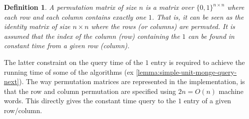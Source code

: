 \documentclass[twoside,11pt,openright]{report}
\newtheorem{mydef}{Definition}
\begin{document}
\begin{mydef}
  A permutation matrix of size $n$ is a matrix over $\{0,1\}^{n \times n}$ where each row and each column contains exactly one $1$. That is, it can be seen as the identity matrix of size $n \times n$ where the rows (or columns) are permuted.
  It is assumed that the index of the column (row) containing the $1$ can be found in constant time from a given row (column).
\end{mydef}
The latter constraint on the query time of the $1$ entry is required to achieve the running time of some of the algorithms (ex \cref{lemma:simple-unit-monge-query-next}). The way permutation matrices are represented in the implementation, is that the row and column permutation are specified using $2n = O(n)$ machine words. This directly gives the constant time query to the $1$ entry of a given row/column.
\end{document}
